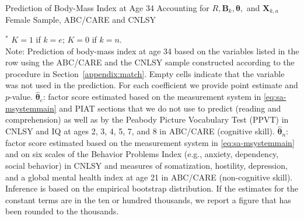 \begin{table}
\begin{threeparttable}
\caption{Prediction of Body-Mass Index at Age 34 Accounting for $R, \bm{B}_k, \bm{\theta},$ and $\bm{X}_{k,a}$ Female Sample, ABC/CARE and CNLSY}
\centering
\scriptsize

\begin{tablenotes}
\footnotesize
\item $^\ast$ $K=1$ if $k=e$; $K=0$ if $k=n$.\\ 
Note: Prediction of body-mass index at age 34 based on the variables listed in the row using the ABC/CARE and the CNLSY sample constructed according to the procedure in Section~\ref{appendix:match}. Empty cells indicate that the variable was not used in the prediction. For each coefficient we provide point estimate and $p$-value. $\hat{\bm{\theta}}_{c}$: factor score estimated based on the measurement system in \eqref{eq:sa-msystemmain} and PIAT sections that we do not use to predict (reading and comprehension) as well as by the Peabody Picture Vocabulary Test (PPVT) in CNLSY and IQ at ages 2, 3, 4, 5, 7, and 8 in ABC/CARE (cognitive skill). $\hat{\bm{\theta}}_{n}$: factor score estimated based on the measurement system in \eqref{eq:sa-msystemmain} and on six scales of the Behavior Problems Index (e.g., anxiety, dependency, social behavior) in CNLSY and measures of somatization, hostility, depression, and a global mental health index at age 21 in ABC/CARE (non-cognitive skill). Inference is based on the empirical bootstrap distribution. If the estimates for the constant terms are in the ten or hundred thousands, we report a figure that has been rounded to the thousands.
\end{tablenotes}
\end{threeparttable}
\end{table}

